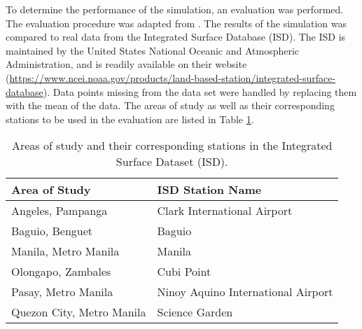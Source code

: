 	To determine the performance of the simulation, an evaluation was performed. The evaluation procedure was adapted from \textcite{Bilang2022}.
	The results of the simulation was compared to real data from the Integrated Surface Database (ISD).
	The ISD is maintained by the United States National Oceanic and Atmospheric Administration, and is readily available on their website 
		(\url{https://www.ncei.noaa.gov/products/land-based-station/integrated-surface-database}).
	Data points missing from the data set were handled by replacing them with the mean of the data.
	The areas of study as well as their corresponding stations to be used in the evaluation are listed in Table \ref{tab:isd-stations}.

	\begin{table}	
		\caption{Areas of study and their corresponding stations in the Integrated Surface Dataset (ISD).}
		\label{tab:isd-stations}
		\centering
		\begin{tabular}{ll}
			\hline \hline
			Area of Study             & ISD Station Name                       \\
			\hline
			Angeles, Pampanga         & Clark International Airport        \\
			Baguio, Benguet           & Baguio                             \\
			Manila, Metro Manila      & Manila                             \\
			Olongapo, Zambales        & Cubi Point                         \\
			Pasay, Metro Manila      & Ninoy Aquino International Airport \\
			Quezon City, Metro Manila & Science Garden \\                   
			\hline
		\end{tabular}	
	\end{table}

